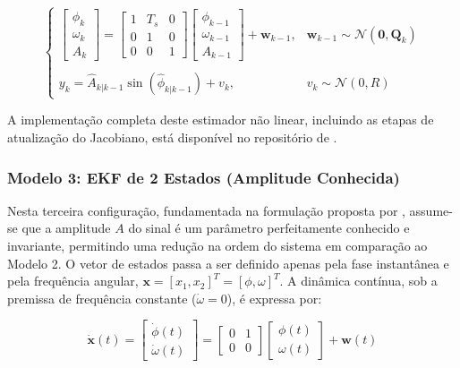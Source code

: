 \documentclass[a4paper,12pt]{article}
\begin{document}
\begin{equation}
    \begin{cases}
        \begin{bmatrix} \phi_{k} \\ \omega_{k} \\ A_{k} \end{bmatrix} = \begin{bmatrix} 1 & T_s & 0 \\ 0 & 1 & 0 \\ 0 & 0 & 1 \end{bmatrix} \begin{bmatrix} \phi_{k-1} \\ \omega_{k-1} \\ A_{k-1} \end{bmatrix} + \mathbf{w}_{k-1}, & \mathbf{w}_{k-1} \sim \mathcal{N}(\mathbf{0}, \mathbf{Q}_k) \\ \\
        y_k = \hat{A}_{k|k-1} \sin(\hat{\phi}_{k|k-1}) + v_k, & v_k \sim \mathcal{N}(0, R)
    \end{cases}
    \label{eq:mod2_sistema_discreto_completo}
\end{equation}

A implementação completa deste estimador não linear, incluindo as etapas de atualização do Jacobiano, está disponível no repositório de .

\subsubsection{Modelo 3: EKF de 2 Estados (Amplitude Conhecida)}
\label{subsubsec:modelo3}

Nesta terceira configuração, fundamentada na formulação proposta por , assume-se que a amplitude $A$ do sinal é um parâmetro perfeitamente conhecido e invariante, permitindo uma redução na ordem do sistema em comparação ao Modelo 2. O vetor de estados passa a ser definido apenas pela fase instantânea e pela frequência angular, $\mathbf{x} = [x_1, x_2]^T = [\phi, \omega]^T$. A dinâmica contínua, sob a premissa de frequência constante ($\dot{\omega} = 0$), é expressa por:

\begin{equation}
    \dot{\mathbf{x}}(t) = \begin{bmatrix} \dot{\phi}(t) \\ \dot{\omega}(t) \end{bmatrix} = \begin{bmatrix} 0 & 1 \\ 0 & 0 \end{bmatrix} \begin{bmatrix} \phi(t) \\ \omega(t) \end{bmatrix} + \mathbf{w}(t)
    \label{eq:mod3_cont_dinamica}
\end{equation}
\end{document}
